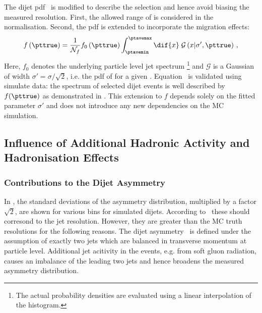 The dijet pdf~ is modified to describe the
\ptave selection and hence avoid biasing the measured resolution.
First, the allowed range of \ptave is considered in the normalisation. 
Second, the \pttrue pdf is extended to incorporate the migration effects:
\begin{equation}
  \label{eq:ResFit:Asym:ModifiedSpectrum}
  f\left(\pttrue\right) = \frac{1}{\mathcal{N}_{f}}
  f_{0}\left(\pttrue\right) \int^{\ptavemax}_{\ptavemin}\dif{x}\;\mathcal{G}\left(x|\sigma',\pttrue\right) \, ,
\end{equation}
Here, $f_{0}$ denotes the underlying particle level jet \pt spectrum \footnote{The actual probability densities are evaluated using a linear interpolation of the histogram.} and $\mathcal{G}$ is a Gaussian of width \mbox{$\sigma' = \sigma/\sqrt{2}$}, i.e. the pdf of \ptave for a given \pttrue.
Equation~ is validated using simulate data:
the \ptgen spectrum of selected dijet events is well described by $f(\pttrue)$ as demonstrated in .
This extension to $f$ depends solely on the fitted parameter $\sigma'$ and does not introduce any new dependencies on the MC simulation.



\subsection{Influence of Additional Hadronic Activity and Hadronisation Effects}\label{sec:ResFit:AddJets}

\subsubsection{Contributions to the Dijet Asymmetry}\label{sec:ResFit:AddJets:Contributions}

In , the standard deviations of
the asymmetry distribution, multiplied by a factor $\sqrt{2}$,
are shown for various \ptgen bins for simulated dijets.
According to~ these should corresond to the
jet \pt resolution.
However, they are greater than the MC truth resolutions for the
following reasons.
The dijet asymmetry~ is defined under the assumption of exactly two jets which are balanced in transverse momentum at particle level.
Additional jet acitivity in the events, e.g. from soft gluon
radiation, causes an imbalance of the leading two jets and hence
broadens the measured asymmetry distribution.

